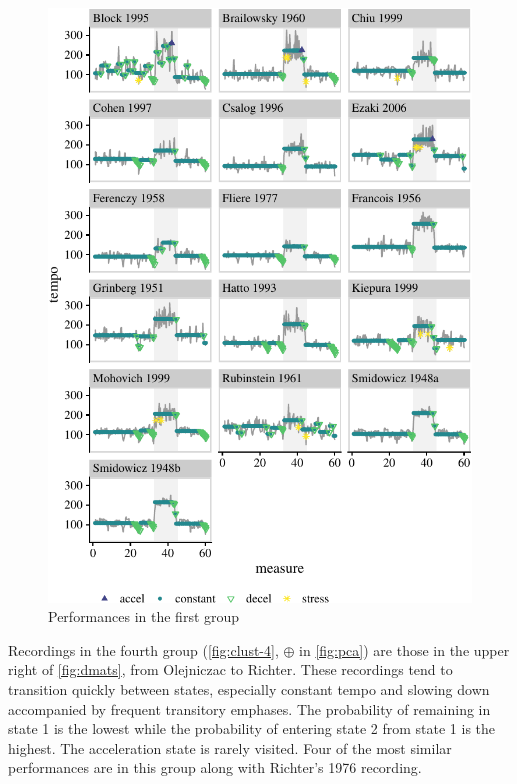 \documentclass[aoas]{imsart}
\begin{document}
\begin{figure}

{\centering \includegraphics{gfx/clust-1-1} 

}

\caption{Performances in the first group}\label{fig:clust-1}
\end{figure}

Recordings in the fourth group (\autoref{fig:clust-4}, \(\oplus\) in
\autoref{fig:pca}) are those in the upper right of \autoref{fig:dmats},
from Olejniczac to Richter. These recordings tend to transition quickly
between states, especially constant tempo and slowing down accompanied
by frequent transitory emphases. The probability of remaining in state 1
is the lowest while the probability of entering state 2 from state 1 is
the highest. The acceleration state is rarely visited. Four of the most
similar performances are in this group along with Richter's 1976
recording.
\end{document}
